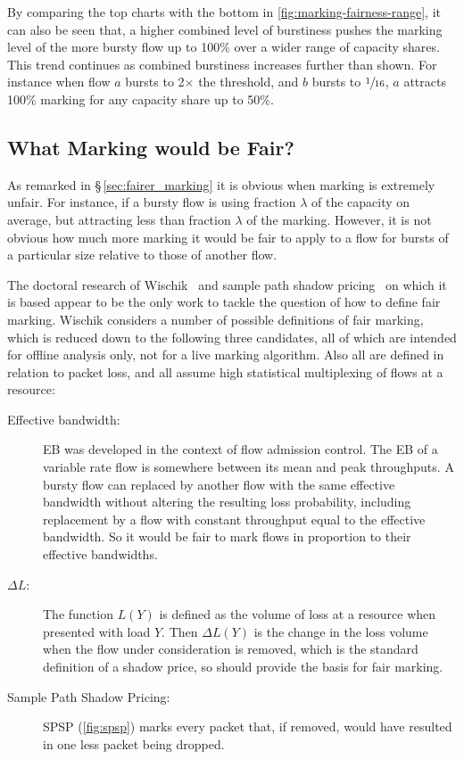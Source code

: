 By comparing the top charts with the bottom in \autoref{fig:marking-fairness-range}, it can also be seen that, a higher combined level of burstiness pushes the marking level of the more bursty flow up to 100\% over a wider range of capacity shares. This trend continues as combined burstiness increases further than shown. For instance when flow \(a\) bursts to 2\(\times\) the threshold, and \(b\) bursts to \(\sfrac{1}{16}\), \(a\) attracts 100\% marking for any capacity share up to 50\%.

\subsection{What Marking would be Fair?}\label{sec:marking_fairness_definition}

As remarked in \S\,\ref{sec:fairer_marking} it is obvious when marking is extremely unfair. For instance, if a bursty flow is using fraction \(\lambda\) of the capacity on average, but attracting less than fraction \(\lambda\) of the marking. However, it is not obvious how much more marking it would be fair to apply to a flow for bursts of a particular size relative to those of another flow.

The doctoral research of Wischik~\cite{Wischik99:Mark_Fairly, Wischik99:Large_Dev_PhD} and sample path shadow pricing~\cite{Kelly98:Shadow_prices_prop_fair} on which it is based appear to be the only work to tackle the question of how to define fair marking. Wischik considers a number of possible definitions of fair marking, which is reduced down to the following three candidates, all of which are intended for offline analysis only, not for a live marking algorithm. Also all are defined in relation to packet loss, and all assume high statistical multiplexing of flows at a resource:
\begin{description}
	\item[Effective bandwidth:] EB was developed in the context of flow admission control. The EB of a variable rate flow is somewhere between its mean and peak throughputs. A bursty flow can replaced by another flow with the same effective bandwidth without altering the resulting loss probability, including replacement by a flow with constant throughput equal to the effective bandwidth. So it would be fair to mark flows in proportion to their effective bandwidths.
	\item[\boldmath\(\Delta{L}\):] The function \(L(Y)\) is defined as the volume of loss at a resource when presented with load \(Y\). Then \(\Delta{L(Y)}\) is the change in the loss volume when the flow under consideration is removed, which is the standard definition of a shadow price, so should provide the basis for fair marking. 
	\item[Sample Path Shadow Pricing:] SPSP (\autoref{fig:spsp}) marks every packet that, if removed, would have resulted in one less packet being dropped.
\end{description}

